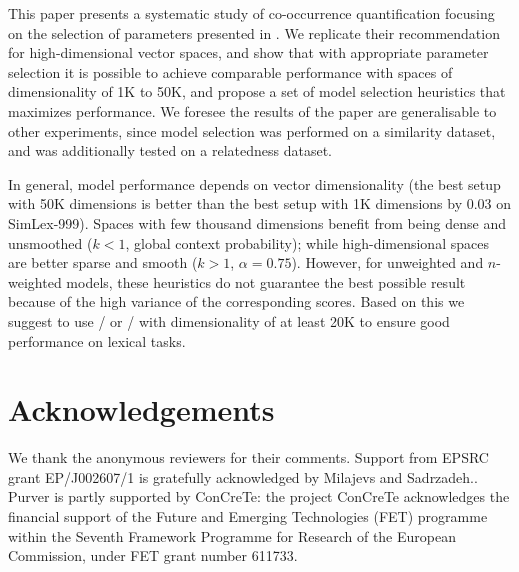 \documentclass[11pt]{article}
\begin{document}
This paper presents a systematic study of co-occurrence quantification focusing on the selection of parameters presented in . We replicate their recommendation for high-dimensional vector spaces, and show that with appropriate parameter selection it is possible to achieve comparable performance with spaces of dimensionality of 1K to 50K, and propose a set of model selection heuristics that maximizes performance. We foresee the results of the paper are generalisable to other experiments, since model selection was performed on a similarity dataset, and was additionally tested on a relatedness dataset.

In general, model performance depends on vector dimensionality (the best setup with 50K dimensions is better than the best setup with 1K dimensions by 0.03 on SimLex-999). Spaces with few thousand dimensions benefit from being dense and unsmoothed  ($k < 1$, global context probability); while high-dimensional spaces are better sparse and smooth  ($k > 1$, $\alpha = 0.75$). However, for unweighted and $n$-weighted models, these heuristics do not guarantee the best possible result because of the high variance of the corresponding scores. Based on this we suggest to use \logNSPMI/ or \logNSCPMI/ with dimensionality of at least 20K to ensure good performance on lexical tasks.

\section*{Acknowledgements}

We thank the anonymous reviewers for their comments. Support from EPSRC grant EP/J002607/1 is gratefully acknowledged by Milajevs and Sadrzadeh..
Purver is partly supported by ConCreTe: the project ConCreTe acknowledges the financial support of the Future and Emerging Technologies (FET) programme within the Seventh Framework Programme for Research of the European Commission, under FET grant number 611733.


\balance

\end{document}
